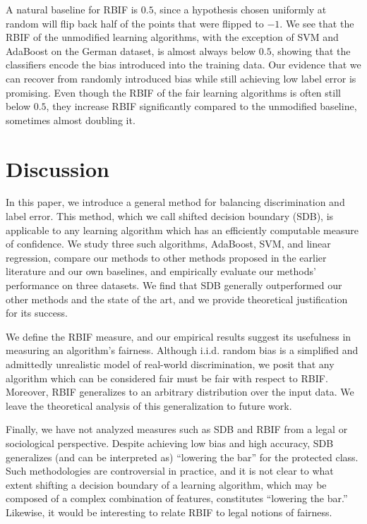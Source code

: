 \documentclass[conference]{IEEEtran}
\begin{document}
A natural baseline for RBIF is $0.5$, since a hypothesis chosen uniformly at
random will flip back half of the points that were flipped to $-1$.  We see
that the RBIF of the unmodified learning algorithms, with the exception of SVM
and AdaBoost on the German dataset, is almost always below $0.5$, showing that
the classifiers encode the bias introduced into the training data.  Our
evidence that we can recover from randomly introduced bias while still
achieving low label error is promising. Even though the RBIF of the fair
learning algorithms is often still below $0.5$, they increase RBIF
significantly compared to the unmodified baseline, sometimes almost doubling
it.

\section{Discussion}\label{sec:discussion}

In this paper, we introduce a general method for balancing discrimination and
label error. This method, which we call shifted decision boundary (SDB),
is applicable to any learning algorithm which has an efficiently computable
measure of confidence. We study three such algorithms, AdaBoost, SVM, and
linear regression, compare our methods to other methods proposed in the
earlier literature and our own baselines, and empirically evaluate our
methods' performance on three datasets. We find that SDB generally outperformed
our other methods and the state of the art, and we provide theoretical justification
for its success. 

We define the RBIF measure, and our empirical results suggest its usefulness in 
measuring an algorithm's fairness. Although i.i.d. random bias is a simplified
and admittedly unrealistic model of real-world discrimination, we posit that
any algorithm which can be considered fair must be fair with respect to RBIF.
Moreover, RBIF generalizes to an arbitrary distribution over the input data. We
leave the theoretical analysis of this generalization to future work.

Finally, we have not analyzed measures such as SDB and RBIF from a legal or
sociological perspective. Despite achieving low bias and high accuracy, SDB
generalizes (and can be interpreted as) ``lowering the bar'' for the protected
class. Such methodologies are controversial in practice, and it is not clear to
what extent shifting a decision boundary of a learning algorithm, which may be
composed of a complex combination of features, constitutes ``lowering the
bar.'' Likewise, it would be interesting to relate RBIF to legal notions of
fairness.
\end{document}
